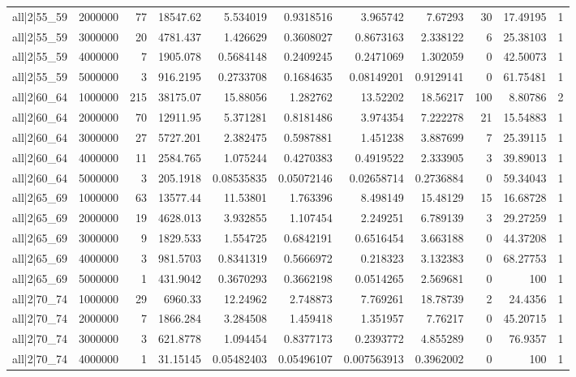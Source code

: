\begin{tabular}{lrrrrrrrrrr}
all|2|55\_59 & 2000000 & 77 & 18547.62 & 5.534019 & 0.9318516 & 3.965742 & 7.67293 & 30 & 17.49195 & 1 \\
all|2|55\_59 & 3000000 & 20 & 4781.437 & 1.426629 & 0.3608027 & 0.8673163 & 2.338122 & 6 & 25.38103 & 1 \\
all|2|55\_59 & 4000000 & 7 & 1905.078 & 0.5684148 & 0.2409245 & 0.2471069 & 1.302059 & 0 & 42.50073 & 1 \\
all|2|55\_59 & 5000000 & 3 & 916.2195 & 0.2733708 & 0.1684635 & 0.08149201 & 0.9129141 & 0 & 61.75481 & 1 \\
all|2|60\_64 & 1000000 & 215 & 38175.07 & 15.88056 & 1.282762 & 13.52202 & 18.56217 & 100 & 8.80786 & 2 \\
all|2|60\_64 & 2000000 & 70 & 12911.95 & 5.371281 & 0.8181486 & 3.974354 & 7.222278 & 21 & 15.54883 & 1 \\
all|2|60\_64 & 3000000 & 27 & 5727.201 & 2.382475 & 0.5987881 & 1.451238 & 3.887699 & 7 & 25.39115 & 1 \\
all|2|60\_64 & 4000000 & 11 & 2584.765 & 1.075244 & 0.4270383 & 0.4919522 & 2.333905 & 3 & 39.89013 & 1 \\
all|2|60\_64 & 5000000 & 3 & 205.1918 & 0.08535835 & 0.05072146 & 0.02658714 & 0.2736884 & 0 & 59.34043 & 1 \\
all|2|65\_69 & 1000000 & 63 & 13577.44 & 11.53801 & 1.763396 & 8.498149 & 15.48129 & 15 & 16.68728 & 1 \\
all|2|65\_69 & 2000000 & 19 & 4628.013 & 3.932855 & 1.107454 & 2.249251 & 6.789139 & 3 & 29.27259 & 1 \\
all|2|65\_69 & 3000000 & 9 & 1829.533 & 1.554725 & 0.6842191 & 0.6516454 & 3.663188 & 0 & 44.37208 & 1 \\
all|2|65\_69 & 4000000 & 3 & 981.5703 & 0.8341319 & 0.5666972 & 0.218323 & 3.132383 & 0 & 68.27753 & 1 \\
all|2|65\_69 & 5000000 & 1 & 431.9042 & 0.3670293 & 0.3662198 & 0.0514265 & 2.569681 & 0 & 100 & 1 \\
all|2|70\_74 & 1000000 & 29 & 6960.33 & 12.24962 & 2.748873 & 7.769261 & 18.78739 & 2 & 24.4356 & 1 \\
all|2|70\_74 & 2000000 & 7 & 1866.284 & 3.284508 & 1.459418 & 1.351957 & 7.76217 & 0 & 45.20715 & 1 \\
all|2|70\_74 & 3000000 & 3 & 621.8778 & 1.094454 & 0.8377173 & 0.2393772 & 4.855289 & 0 & 76.9357 & 1 \\
all|2|70\_74 & 4000000 & 1 & 31.15145 & 0.05482403 & 0.05496107 & 0.007563913 & 0.3962002 & 0 & 100 & 1 \\

\end{tabular}
